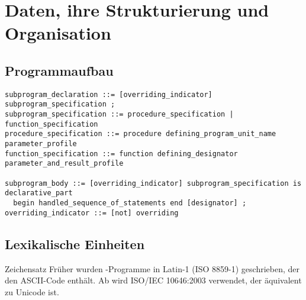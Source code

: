 \section{%
    Daten, ihre Strukturierung und Organisation%
}

\subsection{%
    Programmaufbau%
}

\begin{lstlisting}[language=ebnf,
emph={procedure,function,is,begin,end,not,overriding},
emphstyle=\underbar]
subprogram_declaration ::= [overriding_indicator] subprogram_specification ;
subprogram_specification ::= procedure_specification | function_specification
procedure_specification ::= procedure defining_program_unit_name parameter_profile
function_specification ::= function defining_designator parameter_and_result_profile

subprogram_body ::= [overriding_indicator] subprogram_specification is declarative_part
  begin handled_sequence_of_statements end [designator] ;
overriding_indicator ::= [not] overriding
\end{lstlisting}

\subsection{%
    Lexikalische Einheiten%
}

\begin{Def}{Zeichensatz}
    Früher wurden \Ada{}-Programme in Latin-1 (ISO 8859-1) geschrieben, der den
    ASCII-Code enthält.
    Ab  wird ISO/IEC 10646:2003 verwendet, der
    äquivalent zu Unicode ist.
\end{Def}

